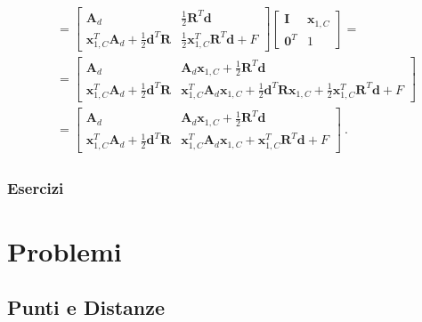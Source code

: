 \documentclass[letterpaper,10pt,italian]{jupyterBook}
\begin{document}
\begin{equation*}
\begin{split}
\begin{aligned}
 & = \begin{bmatrix} \mathbf{A}_d & \frac{1}{2} \mathbf{R}^T \mathbf{d} \\ \mathbf{x}_{1,C}^T \mathbf{A}_d + \frac{1}{2} \mathbf{d}^T \mathbf{R} & \frac{1}{2} \mathbf{x}_{1,C}^T \mathbf{R}^T \mathbf{d} + F \end{bmatrix} \begin{bmatrix} \mathbf{I} & \mathbf{x}_{1,C} \\ \mathbf{0}^T & 1 \end{bmatrix} = \\ 
 & = \begin{bmatrix} \mathbf{A}_d & \mathbf{A}_d \mathbf{x}_{1,C} + \frac{1}{2} \mathbf{R}^T \mathbf{d} \\ \mathbf{x}_{1,C}^T \mathbf{A}_d + \frac{1}{2} \mathbf{d}^T \mathbf{R} & \mathbf{x}_{1,C}^T \mathbf{A}_d \mathbf{x}_{1,C} + \frac{1}{2} \mathbf{d}^T \mathbf{R} \mathbf{x}_{1,C} + \frac{1}{2} \mathbf{x}^T_{1,C} \mathbf{R}^T \mathbf{d} + F \end{bmatrix} \\
 & = \begin{bmatrix} \mathbf{A}_d & \mathbf{A}_d \mathbf{x}_{1,C} + \frac{1}{2} \mathbf{R}^T \mathbf{d} \\ \mathbf{x}_{1,C}^T \mathbf{A}_d + \frac{1}{2} \mathbf{d}^T \mathbf{R} & \mathbf{x}_{1,C}^T \mathbf{A}_d \mathbf{x}_{1,C} + \mathbf{x}^T_{1,C} \mathbf{R}^T \mathbf{d} + F \end{bmatrix} \ .
\end{aligned}\end{split}
\end{equation*}

\subsubsection{Esercizi}
\label{\detokenize{ch/analytic_geometry/analytic_geometry_2d/conics-and-quadratic-forms:esercizi}}
\sphinxstepscope


\section{Problemi}
\label{\detokenize{ch/analytic_geometry/analytic_geometry_2d/problems:problemi}}\label{\detokenize{ch/analytic_geometry/analytic_geometry_2d/problems:geometry-analytic-2d-problems}}\label{\detokenize{ch/analytic_geometry/analytic_geometry_2d/problems::doc}}

\subsection{Punti e Distanze}
\label{\detokenize{ch/analytic_geometry/analytic_geometry_2d/problems:punti-e-distanze}} \label{exercise:ch/analytic_geometry/analytic_geometry_2d/problems-exercise-0}
\end{document}

